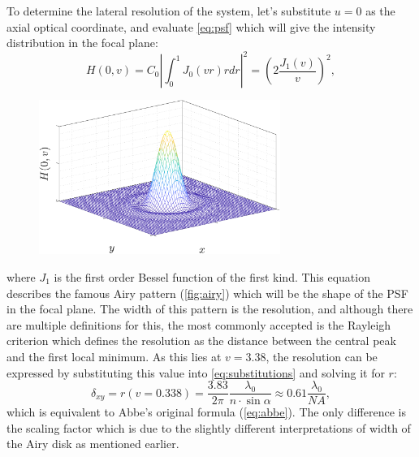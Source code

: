     To determine the lateral resolution of the system, let's substitute $u=0$ as the axial optical coordinate, and evaluate \autoref{eq:psf} which will give the intensity distribution in the focal plane:
    \begin{equation}
      H(0,v) = C_0 \left| \int_0^1 J_0(vr)rdr \right|^2 = \left(2\frac{J_1(v)}{v} \right) ^2,
      \label{eq:airy}
    \end{equation}
    \begin{figure}
      \centering
      \includegraphics[width=0.7\textwidth]{airy}
      \label{fig:airy}
    \end{figure}


    

    where $J_1$ is the first order Bessel function of the first kind.
    This equation describes the famous Airy pattern (\autoref{fig:airy}) which will be the shape of the PSF in the focal plane. The width of this pattern is the resolution, and although there are multiple definitions for this, the most commonly accepted is the Rayleigh criterion \cite{f.r.s_xxxi._1879, born_principles_2013} which defines the resolution as the distance between the central peak and the first local minimum. As this lies at $v=3.38$, the resolution can be expressed by substituting this value into \autoref{eq:substitutions} and solving it for $r$:
    \begin{equation}
      \delta_{xy} = r(v=0.338) = \frac{3.83}{2\pi} \frac{\lambda_0}{n\cdot \sin \alpha} \approx 0.61 \frac{\lambda_0}{NA},
      \label{eq:lateralRes}
    \end{equation}
    which is equivalent to Abbe's original formula (\autoref{eq:abbe}). The only difference is the scaling factor which is due to the slightly different interpretations of width of the Airy disk as mentioned earlier.

